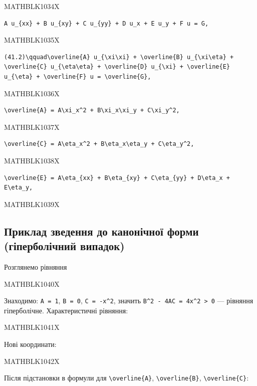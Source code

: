 \documentclass[
  ukrainian,
]{article}
\begin{document}
MATHBLK1034X

\begin{verbatim}
A u_{xx} + B u_{xy} + C u_{yy} + D u_x + E u_y + F u = G,
\end{verbatim}

MATHBLK1035X

\begin{verbatim}
(41.2)\qquad\overline{A} u_{\xi\xi} + \overline{B} u_{\xi\eta} + \overline{C} u_{\eta\eta} + \overline{D} u_{\xi} + \overline{E} u_{\eta} + \overline{F} u = \overline{G},
\end{verbatim}

MATHBLK1036X

\begin{verbatim}
\overline{A} = A\xi_x^2 + B\xi_x\xi_y + C\xi_y^2,
\end{verbatim}

MATHBLK1037X

\begin{verbatim}
\overline{C} = A\eta_x^2 + B\eta_x\eta_y + C\eta_y^2,
\end{verbatim}

MATHBLK1038X

\begin{verbatim}
\overline{E} = A\eta_{xx} + B\eta_{xy} + C\eta_{yy} + D\eta_x + E\eta_y,
\end{verbatim}

MATHBLK1039X

\subsection{Приклад зведення до канонічної форми (гіперболічний
випадок)}\label{ux43fux440ux438ux43aux43bux430ux434-ux437ux432ux435ux434ux435ux43dux43dux44f-ux434ux43e-ux43aux430ux43dux43eux43dux456ux447ux43dux43eux457-ux444ux43eux440ux43cux438-ux433ux456ux43fux435ux440ux431ux43eux43bux456ux447ux43dux438ux439-ux432ux438ux43fux430ux434ux43eux43a}

Розглянемо рівняння

MATHBLK1040X

Знаходимо: \texttt{A\ =\ 1}, \texttt{B\ =\ 0}, \texttt{C\ =\ -x\^{}2},
значить \texttt{B\^{}2\ -\ 4AC\ =\ 4x\^{}2\ \textgreater{}\ 0} ---
рівняння гіперболічне. Характеристичні рівняння:

MATHBLK1041X

Нові координати:

MATHBLK1042X

Після підстановки в формули для \texttt{\textbackslash{}overline\{A\}},
\texttt{\textbackslash{}overline\{B\}},
\texttt{\textbackslash{}overline\{C\}}:
\end{document}
